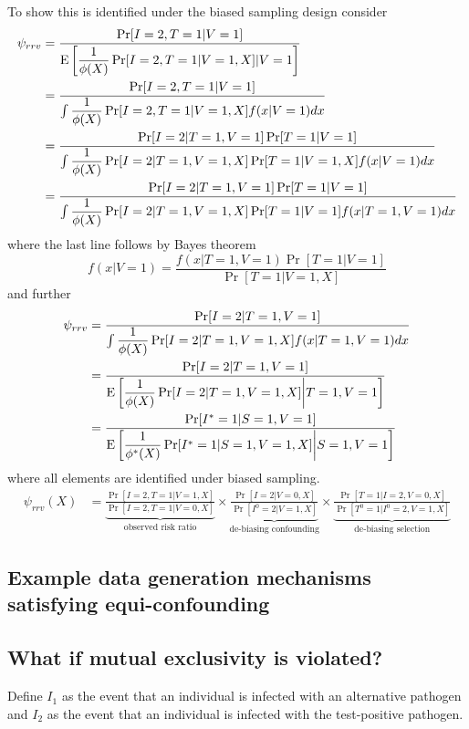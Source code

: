 \begin{appendix}
To show this is identified under the biased sampling design consider
\begin{align*}
    \psi_{rrv} &= \dfrac{\Pr[I = 2, T = 1 | V = 1]}{\operatorname{E}\left[\dfrac{1}{\phi(X)} \Pr[I = 2, T = 1 | V = 1, X] | V = 1\right]} \\
    &= \dfrac{\Pr[I = 2, T = 1 | V = 1]}{\int \dfrac{1}{\phi(X)} \Pr[I = 2, T = 1 | V = 1, X] f(x | V = 1) dx} \\
    &= \dfrac{\Pr[I = 2 | T = 1, V = 1] \Pr[T = 1 | V = 1]}{\int \dfrac{1}{\phi(X)} \Pr[I = 2 | T = 1, V = 1, X] \Pr[T = 1 | V = 1, X]  f(x | V = 1) dx} \\
    &= \dfrac{\Pr[I = 2 | T = 1, V = 1] \Pr[T = 1 | V = 1]}{\int \dfrac{1}{\phi(X)} \Pr[I = 2 | T = 1, V = 1, X] \Pr[T = 1 | V = 1]  f(x | T = 1, V = 1) dx} 
\end{align*}
where the last line follows by Bayes theorem 
\begin{equation*}
    f(x | V = 1) = \dfrac{f(x | T = 1, V = 1)\Pr[T = 1 | V = 1]}{\Pr[T = 1 | V = 1, X]}
\end{equation*}
and further
\begin{align*}
    \psi_{rrv} &= \dfrac{\Pr[I = 2 | T = 1, V = 1]}{\int \dfrac{1}{\phi(X)} \Pr[I = 2 | T = 1, V = 1, X] f(x | T = 1, V = 1) dx} \\
    &= \dfrac{\Pr[I = 2 | T = 1, V = 1]}{\operatorname{E}\left[\dfrac{1}{\phi(X)} \Pr[I = 2 | T = 1, V = 1, X] \bigg| T = 1, V = 1\right]} \\
    &= \dfrac{\Pr[I^* = 1 | S = 1, V = 1]}{\operatorname{E}\left[\dfrac{1}{\phi^*(X)} \Pr[I^* = 1 | S = 1, V = 1, X] \bigg| S = 1, V = 1\right]} 
\end{align*}
where all elements are identified under biased sampling.
\begin{align*}
    \psi_{rrv}(X) &=\underbrace{\frac{\Pr[I = 2, T = 1 | V = 1, X]}{\Pr[I = 2, T = 1 | V = 0, X]}}_{\text{observed risk ratio}} \times \underbrace{\frac{\Pr[I = 2 | V = 0, X]}{\Pr[I^0 = 2 | V = 1, X]}}_{\text{de-biasing confounding}} \times \underbrace{\frac{\Pr[T = 1 | I = 2, V = 0, X]}{\Pr[T^0 = 1 | I^0 = 2, V = 1, X]}}_{\text{de-biasing selection}} 
\end{align*}

\subsection{Example data generation mechanisms satisfying equi-confounding}

\subsection{What if mutual exclusivity is violated?}
Define $I_1$ as the event that an individual is infected with an alternative pathogen and $I_2$ as the event that an individual is infected with the test-positive pathogen. 


\end{appendix}
